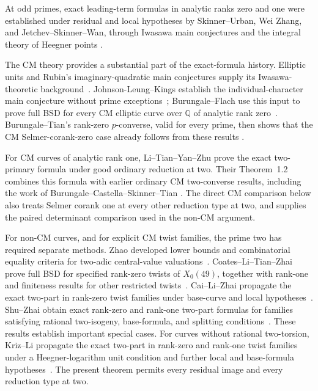 At odd primes, exact leading-term formulas in analytic ranks zero and
one were established under residual and local hypotheses by
Skinner--Urban, Wei Zhang, and Jetchev--Skinner--Wan, through Iwasawa
main conjectures and the integral theory of Heegner points
\cite{SkinnerUrban2014,Zhang2014,JetchevSkinnerWan2017}.

The CM theory provides a substantial part of the exact-formula
history. Elliptic units and Rubin's imaginary-quadratic main conjectures
supply its Iwasawa-theoretic background~\cite{Rubin1991}.
Johnson-Leung--Kings establish the individual-character main conjecture
without prime exceptions~\cite{JLK11}; Burungale--Flach use this input
to prove full BSD for every CM elliptic curve over \(\mathbb Q\) of
analytic rank zero~\cite{BF23}. Burungale--Tian's rank-zero
\(p\)-converse, valid for every prime, then shows that the CM
Selmer-corank-zero case already follows from these results
\cite{BurungaleTian26}.

For CM curves of analytic rank one, Li--Tian--Yan--Zhu prove the exact
two-primary formula under good ordinary reduction at two. Their
Theorem~1.2 combines this formula with earlier ordinary CM
two-converse results, including the work of Burungale--Castella--Skinner--Tian
\cite{LTYZ2025,BCST22}. The direct CM comparison below also treats
Selmer corank one at every other reduction type at two, and supplies
the paired determinant comparison used in the non-CM argument.

For non-CM curves, and for explicit CM twist families, the prime two
has required separate methods. Zhao developed lower bounds and
combinatorial equality criteria for two-adic central-value
valuations~\cite{Zhao1997}. Coates--Li--Tian--Zhai prove full BSD for
specified rank-zero twists of \(X_0(49)\), together with rank-one
and finiteness results for other restricted twists~\cite{CLTZ2015}.
Cai--Li--Zhai propagate the exact two-part in rank-zero twist
families under base-curve and local hypotheses~\cite{CLZ2020}.
Shu--Zhai obtain exact rank-zero and rank-one two-part formulas for
families satisfying rational two-isogeny, base-formula, and splitting
conditions~\cite{ShuZhai21}. These results establish important
special cases. For curves without rational two-torsion, Kriz--Li
propagate the exact two-part in rank-zero and rank-one twist families
under a Heegner-logarithm unit condition and further local and
base-formula hypotheses~\cite[Theorem~5.1]{KrizLi2019}.
The present theorem permits every residual image and every reduction
type at two.

